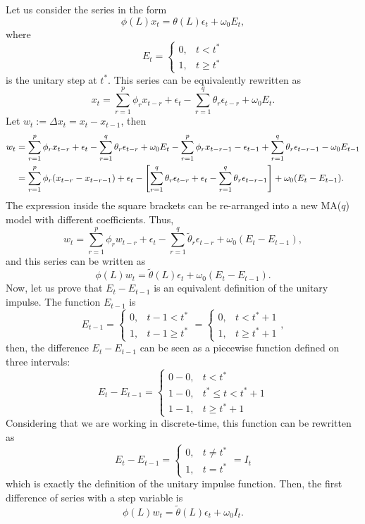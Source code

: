 \documentclass[fleqn]{article}
\let\originalleft\left
\let\originalright\right
\renewcommand{\left}{\mathopen{}\mathclose\bgroup\originalleft}
\renewcommand{\right}{\aftergroup\egroup\originalright}
\begin{document}
\begin{enumerate}
    Let us consider the series in the form 
    \[
    \phi(L)x_t=\theta(L)\epsilon_t + \omega_0E_t,
    \]
    where
    \[
    E_t=\begin{cases}
    0, & t < t^*\\
    1, & t \geq t^*
    \end{cases}
    \]
    is the unitary step at $t^*$. This series can be equivalently rewritten as 
    \[
    x_t=\sum_{r=1}^p\phi_rx_{t-r}+\epsilon_t-\sum_{r=1}^q\theta_r\epsilon_{t-r}+\omega_0E_t.
    \]
    Let $w_t:=\Delta x_t=x_t-x_{t-1}$, then
    \[
    \begin{split}
    w_t&=\sum_{r=1}^p\phi_rx_{t-r}+\epsilon_t-\sum_{r=1}^q\theta_r\epsilon_{t-r}+\omega_0E_t - \sum_{r=1}^p\phi_rx_{t-r-1}-\epsilon_{t-1}+\sum_{r=1}^q\theta_r\epsilon_{t-r-1}-\omega_0E_{t-1}\\
    &=\sum_{r=1}^p\phi_r(x_{t-r}-x_{t-r-1})+\epsilon_t-\left[\sum_{r=1}^q\theta_r\epsilon_{t-r}+\epsilon_t-\sum_{r=1}^q\theta_r\epsilon_{t-r-1}\right]+\omega_0(E_t-E_{t-1}).
    \end{split}
    \]
    The expression inside the square brackets can be re-arranged into a new MA($q$) model with different coefficients. Thus,
    \[
    w_t=\sum_{r=1}^p\phi_rw_{t-r}+\epsilon_t-\sum_{r=1}^q\tilde{\theta}_r\epsilon_{t-r}+\omega_0(E_t-E_{t-1}),
    \]
    and this series can be written as
    \[
    \phi(L)w_t=\tilde{\theta}(L)\epsilon_t+\omega_0(E_t-E_{t-1}).
    \]
    Now, let us prove that $E_t-E_{t-1}$ is an equivalent definition of the unitary impulse. The function $E_{t-1}$ is 
    \[
    E_{t-1} = \begin{cases}
    0, & t-1 < t^*\\
    1, & t-1 \geq t^*
    \end{cases}=\begin{cases}
    0, & t < t^*+1\\
    1, & t \geq t^*+1
    \end{cases},
    \]
    then, the difference $E_t-E_{t-1}$ can be seen as a piecewise function defined on three intervals: 
    \[
    E_t-E_{t-1} = \begin{cases}
    0-0, & t < t^*\\
    1-0, & t^* \leq t < t^*+1\\
    1-1, & t\geq t^*+1
    \end{cases}
    \]
    Considering that we are working in discrete-time, this function can be rewritten as
    \[
    E_t-E_{t-1} = \begin{cases}
    0, & t \neq t^*\\
    1, & t = t^*
    \end{cases}=I_t
    \]
    which is exactly the definition of the unitary impulse function. Then, the first difference of series with a step variable is
    \[
    \phi(L)w_t=\tilde{\theta}(L)\epsilon_t+\omega_0I_t.
    \]
    

\end{enumerate}
\end{document}
